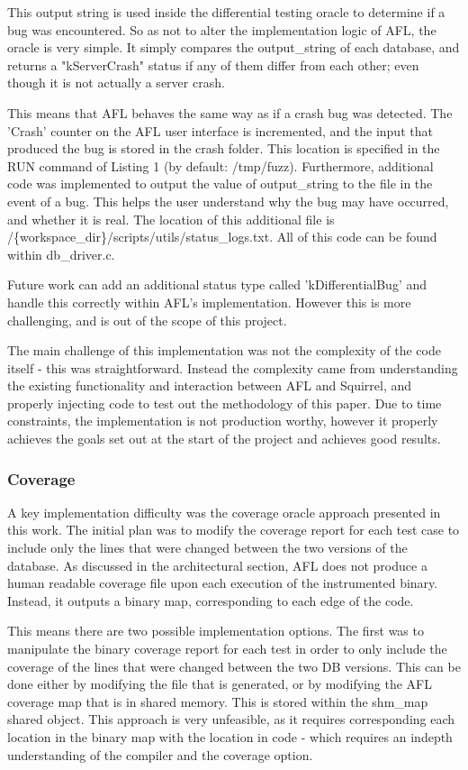 \documentclass[sigconf]{acmart}
\begin{document}
This output string is used inside the differential testing oracle to determine if a bug was encountered. So as not to alter the implementation logic of AFL, the oracle is very simple. It simply compares the output\_string of each database, and returns a "kServerCrash" status if any of them differ from each other; even though it is not actually a server crash.

This means that AFL behaves the same way as if a crash bug was detected. The 'Crash' counter on the AFL user interface is incremented, and the input that produced the bug is stored in the crash folder. This location is specified in the RUN command of Listing 1 (by default: /tmp/fuzz). Furthermore, additional code was implemented to output the value of output\_string to the file in the event of a bug. This helps the user understand why the bug may have occurred, and whether it is real. The location of this additional file is /\{workspace\_dir\}/scripts/utils/status\_logs.txt. All of this code can be found within db\_driver.c.

Future work can add an additional status type called 'kDifferentialBug' and handle this correctly within AFL's implementation. However this is more challenging, and is out of the scope of this project.

The main challenge of this implementation was not the complexity of the code itself - this was straightforward. Instead the complexity came from understanding the existing functionality and interaction between AFL and Squirrel, and properly injecting code to test out the methodology of this paper. Due to time constraints, the implementation is not production worthy, however it properly achieves the goals set out at the start of the project and achieves good results.

\subsubsection{Coverage}
A key implementation difficulty was the coverage oracle approach presented in this work. The initial plan was to modify the coverage report for each test case to include only the lines that were changed between the two versions of the database. As discussed in the architectural section, AFL does not produce a human readable coverage file upon each execution of the instrumented binary. Instead, it outputs a binary map, corresponding to each edge of the code.

This means there are two possible implementation options. The first was to manipulate the binary coverage report for each test in order to only include the coverage of the lines that were changed between the two DB versions. This can be done either by modifying the file that is generated, or by modifying the AFL coverage map that is in shared memory. This is stored within the shm\_map shared object. This approach is very unfeasible, as it requires corresponding each location in the binary map with the location in code - which requires an indepth understanding of the compiler and the coverage option.
\end{document}
